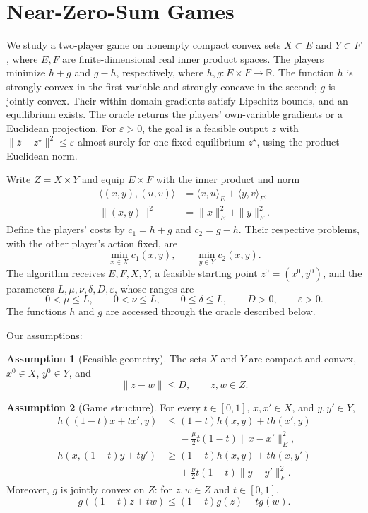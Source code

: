 \documentclass[10pt]{article}
\theoremstyle{definition}
\newtheorem{assumption}{Assumption}
\begin{document}
\section*{Near-Zero-Sum Games}
We study a two-player game on nonempty compact convex sets $X\subset E$ and $Y\subset F$, where $E,F$ are finite-dimensional real inner product spaces. The players minimize $h+g$ and $g-h$, respectively, where $h,g:E\times F\to\mathbb{R}$. The function $h$ is strongly convex in the first variable and strongly concave in the second; $g$ is jointly convex. Their within-domain gradients satisfy Lipschitz bounds, and an equilibrium exists. The oracle returns the players' own-variable gradients or a Euclidean projection. For $\varepsilon>0$, the goal is a feasible output $\bar z$ with $\|\bar z-z^\star\|^2\leq\varepsilon$ almost surely for one fixed equilibrium $z^\star$, using the product Euclidean norm.

Write $Z=X\times Y$ and equip $E\times F$ with the inner product and norm
\[
\begin{aligned}
\langle (x,y),(u,v)\rangle
&=\langle x,u\rangle_E+\langle y,v\rangle_F,\\
\|(x,y)\|^2&=\|x\|_E^2+\|y\|_F^2.
\end{aligned}
\]
Define the players' costs by $c_1=h+g$ and $c_2=g-h$. Their respective problems, with the other player's action fixed, are
\[
\min_{x\in X} c_1(x,y),
\qquad
\min_{y\in Y} c_2(x,y).
\]
The algorithm receives $E,F,X,Y$, a feasible starting point $z^0=(x^0,y^0)$, and the parameters $L,\mu,\nu,\delta,D,\varepsilon$, whose ranges are
\[
0<\mu\leq L,\qquad 0<\nu\leq L,\qquad
0\leq\delta\leq L,\qquad D>0,\qquad\varepsilon>0.
\]
The functions $h$ and $g$ are accessed through the oracle described below.

Our assumptions:
\begin{assumption}[Feasible geometry]
The sets $X$ and $Y$ are compact and convex, $x^0\in X$, $y^0\in Y$, and
\[
\|z-w\|\leq D,\qquad z,w\in Z.
\]
\end{assumption}

\begin{assumption}[Game structure]
For every $t\in[0,1]$, $x,x'\in X$, and $y,y'\in Y$,
\[
\begin{aligned}
h((1-t)x+tx',y)
&\leq (1-t)h(x,y)+t h(x',y)\\
&\phantom{\leq{}}-\frac{\mu}{2}t(1-t)\|x-x'\|_E^2,\\
h(x,(1-t)y+ty')
&\geq (1-t)h(x,y)+t h(x,y')\\
&\phantom{\geq{}}+\frac{\nu}{2}t(1-t)\|y-y'\|_F^2.
\end{aligned}
\]
Moreover, $g$ is jointly convex on $Z$: for $z,w\in Z$ and $t\in[0,1]$,
\[
g((1-t)z+tw)\leq (1-t)g(z)+t g(w).
\]
\end{assumption}
\end{document}
